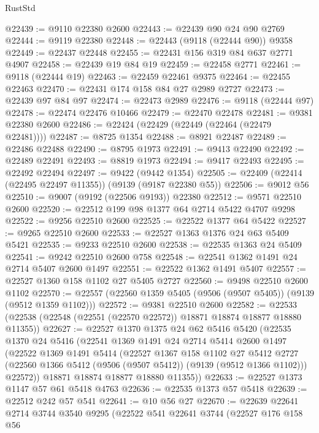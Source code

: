 \begin{lexlean}{RustStd}
\begin{coremodule}
@22439 := @9110 @22380 @2600
@22443 := @22439 @90 @24 @90 @2769
@22444 := @9119 @22380
@22448 := @22443 (@9118 (@22444 @90)) @9358
@22449 := @22437 @22448
@22455 := @22431 @156 @319 @84 @637 @2771 @4907
@22458 := @22439 @19 @84 @19
@22459 := @22458 @2771
@22461 := @9118 (@22444 @19)
@22463 := @22459 @22461 @9375
@22464 := @22455 @22463
@22470 := @22431 @174 @158 @84 @27 @2989 @2727
@22473 := @22439 @97 @84 @97
@22474 := @22473 @2989
@22476 := @9118 (@22444 @97)
@22478 := @22474 @22476 @10466
@22479 := @22470 @22478
@22481 := @9381 @22380 @2600
@22486 := @22424 (@22429 (@22449 (@22464 (@22479 @22481))))
@22487 := @8725 @1354
@22488 := @8921 @22487
@22489 := @22486 @22488
@22490 := @8795 @1973
@22491 := @9413 @22490
@22492 := @22489 @22491
@22493 := @8819 @1973
@22494 := @9417 @22493
@22495 := @22492 @22494
@22497 := @9422 (@9442 @1354)
@22505 := @22409 (@22414 (@22495 @22497 @11355)) (@9139 (@9187 @22380 @55))
@22506 := @9012 @56
@22510 := @9007 (@9192 (@22506 @9193)) @22380
@22512 := @9571 @22510 @2600
@22520 := @22512 @199 @98 @1377 @64 @2714 @5422 @4707 @9298
@22522 := @9256 @22510 @2600
@22525 := @22522 @1377 @64 @5422
@22527 := @9265 @22510 @2600
@22533 := @22527 @1363 @1376 @24 @63 @5409 @5421
@22535 := @9233 @22510 @2600
@22538 := @22535 @1363 @24 @5409
@22541 := @9242 @22510 @2600 @758
@22548 := @22541 @1362 @1491 @24 @2714 @5407 @2600 @1497
@22551 := @22522 @1362 @1491 @5407
@22557 := @22527 @1360 @158 @1102 @27 @5405 @2727
@22560 := @9498 @22510 @2600 @1102
@22570 := @22557 (@22560 @1359 @5405 (@9506 (@9507 @5405)) (@9139 (@9512 @1359 @1102)))
@22572 := @9381 @22510 @2600
@22582 := @22533 (@22538 (@22548 (@22551 (@22570 @22572)) @18871 @18874 @18877 @18880 @11355))
@22627 := @22527
    @1370
    @1375
    @24
    @62
    @5416
    @5420
    (@22535
      @1370
      @24
      @5416
      (@22541
        @1369
        @1491
        @24
        @2714
        @5414
        @2600
        @1497
        (@22522
          @1369
          @1491
          @5414
          (@22527
            @1367
            @158
            @1102
            @27
            @5412
            @2727
            (@22560 @1366 @5412 (@9506 (@9507 @5412)) (@9139 (@9512 @1366 @1102)))
            @22572))
        @18871
        @18874
        @18877
        @18880
        @11355))
@22633 := @22527 @1373 @1147 @57 @61 @5418 @4763
@22636 := @22535 @1373 @57 @5418
@22639 := @22512 @242 @57 @541
@22641 := @10 @56 @27
@22670 := @22639
    @22641
    @2714
    @3744
    @3540
    @9295
    (@22522
      @541
      @22641
      @3744
      (@22527
        @176
        @158
        @56

\end{coremodule}
\end{lexlean}
